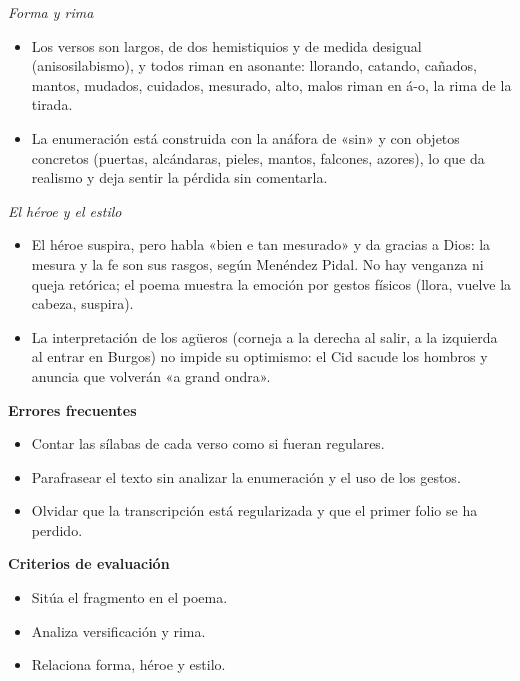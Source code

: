 \documentclass{book}
\begin{document}
\begin{tcolorbox}[title={Ejercicio resuelto}, studiumworked, breakable]
\noindent\textit{Forma y rima}
\begin{itemize}
\item Los versos son largos, de dos hemistiquios y de medida desigual (anisosilabismo), y todos riman en asonante: llorando, catando, cañados, mantos, mudados, cuidados, mesurado, alto, malos riman en á-o, la rima de la tirada.
\item La enumeración está construida con la anáfora de «sin» y con objetos concretos (puertas, alcándaras, pieles, mantos, falcones, azores), lo que da realismo y deja sentir la pérdida sin comentarla.
\end{itemize}

\noindent\textit{El héroe y el estilo}
\begin{itemize}
\item El héroe suspira, pero habla «bien e tan mesurado» y da gracias a Dios: la mesura y la fe son sus rasgos, según Menéndez Pidal. No hay venganza ni queja retórica; el poema muestra la emoción por gestos físicos (llora, vuelve la cabeza, suspira).
\item La interpretación de los agüeros (corneja a la derecha al salir, a la izquierda al entrar en Burgos) no impide su optimismo: el Cid sacude los hombros y anuncia que volverán «a grand ondra».
\end{itemize}

\noindent\textbf{Errores frecuentes}
\begin{itemize}
\item Contar las sílabas de cada verso como si fueran regulares.
\item Parafrasear el texto sin analizar la enumeración y el uso de los gestos.
\item Olvidar que la transcripción está regularizada y que el primer folio se ha perdido.
\end{itemize}

\noindent\textbf{Criterios de evaluación}
\begin{itemize}
\item Sitúa el fragmento en el poema.
\item Analiza versificación y rima.
\item Relaciona forma, héroe y estilo.
\end{itemize}
\end{tcolorbox}
\end{document}
